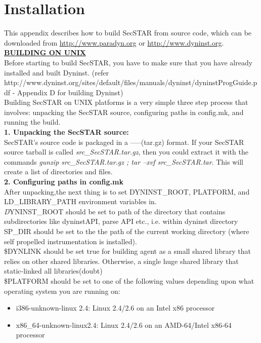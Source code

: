 \section{Installation}
This appendix describes how to build SecSTAR from source code, which can be downloaded from \url{http://www.paradyn.org} or \url{http://www.dyninst.org}. \\

\textbf \underline{BUILDING ON UNIX}\\
Before starting to build SecSTAR, you have to make sure that you have already installed and built Dyninst. (refer http://www.dyninst.org/sites/default/files/manuals/dyninst/dyninstProgGuide.pdf - Appendix D for building Dyninst) \\

Building SecSTAR on UNIX platforms is a very simple three step process that involves: unpacking the SecSTAR source, configuring paths in config.mk, and running the build. \\

\textbf{1. Unpacking the SecSTAR source:} \\
SecSTAR’s source code is packaged in a -----(tar.gz) format. If your SecSTAR source tarball is called \textit{src\_SecSTAR.tar.gz}, then you could extract it with the commands \textit{gunzip src\_SecSTAR.tar.gz ; tar –xvf src\_SecSTAR.tar}. This will create a list of directories and files.  \\

\textbf{2. Configuring paths in config.mk} \\
After unpacking,the next thing is to set DYNINST\_ROOT, PLATFORM, and LD\_LIBRARY\_PATH environment variables in.  \\
{\textit DYNINST\_ROOT} should be set to path of the directory that contains subdirectories like dyninstAPI, parse API etc.,  i.e. within dyninst directory SP\_DIR should be set to the the path of the current working directory (where self propelled instrumentation is installed). \\

\$DYNLINK should be set true for building agent as a small shared library that relies on other shared libraries. Otherwise, a single huge shared library that static-linked all libraries(doubt) \\

\$PLATFORM should be set to one of the following values depending upon what operating system you are running on: \\
\begin{itemize}
  \item i386-unknown-linux 2.4: Linux 2.4/2.6 on an Intel x86 processor
  \item x86\_64-unknown-linux2.4: Linux 2.4/2.6 on an AMD-64/Intel x86-64 processor
\end{itemize}

